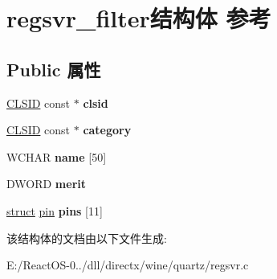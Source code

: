 \hypertarget{structregsvr__filter}{}\section{regsvr\+\_\+filter结构体 参考}
\label{structregsvr__filter}
\subsection*{Public 属性}
\begin{DoxyCompactItemize}
\item 
\mbox{\label{structregsvr__filter_a7cdb9a33f9024a58e35420623c23ce6d}} 
\hyperlink{struct___i_i_d}{C\+L\+S\+ID} const  $\ast$ {\bfseries clsid}
\item 
\mbox{\label{structregsvr__filter_a4ef73511a6d88ccc5ada05270cf0bd3e}} 
\hyperlink{struct___i_i_d}{C\+L\+S\+ID} const  $\ast$ {\bfseries category}
\item 
\mbox{\label{structregsvr__filter_a98a07980f9da1d249af5db93ac2004e3}} 
W\+C\+H\+AR {\bfseries name} \mbox{[}50\mbox{]}
\item 
\mbox{\label{structregsvr__filter_a58da8d2da4acabf93b54cac2adb52bf4}} 
D\+W\+O\+RD {\bfseries merit}
\item 
\mbox{\label{structregsvr__filter_ae03308fc66c4b5d75cc12e0a1f4a01fb}} 
\hyperlink{interfacestruct}{struct} \hyperlink{structpin}{pin} {\bfseries pins} \mbox{[}11\mbox{]}
\end{DoxyCompactItemize}


该结构体的文档由以下文件生成\+:\begin{DoxyCompactItemize}
\item 
E\+:/\+React\+O\+S-\/0../dll/directx/wine/quartz/regsvr.\+c\end{DoxyCompactItemize}
